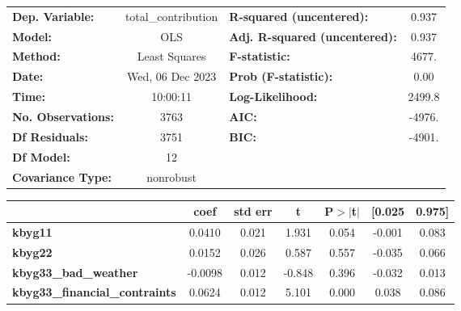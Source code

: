 \begin{center}
\begin{tabular}{lclc}
\toprule
\textbf{Dep. Variable:}                      & total\_contribution & \textbf{  R-squared (uncentered):}      &     0.937   \\
\textbf{Model:}                              &         OLS         & \textbf{  Adj. R-squared (uncentered):} &     0.937   \\
\textbf{Method:}                             &    Least Squares    & \textbf{  F-statistic:       }          &     4677.   \\
\textbf{Date:}                               &   Wed, 06 Dec 2023  & \textbf{  Prob (F-statistic):}          &     0.00    \\
\textbf{Time:}                               &       10:00:11      & \textbf{  Log-Likelihood:    }          &    2499.8   \\
\textbf{No. Observations:}                   &          3763       & \textbf{  AIC:               }          &    -4976.   \\
\textbf{Df Residuals:}                       &          3751       & \textbf{  BIC:               }          &    -4901.   \\
\textbf{Df Model:}                           &            12       & \textbf{                     }          &             \\
\textbf{Covariance Type:}                    &      nonrobust      & \textbf{                     }          &             \\
\bottomrule
\end{tabular}
\begin{tabular}{lcccccc}
                                             & \textbf{coef} & \textbf{std err} & \textbf{t} & \textbf{P$> |$t$|$} & \textbf{[0.025} & \textbf{0.975]}  \\
\midrule
\textbf{kbyg11}                              &       0.0410  &        0.021     &     1.931  &         0.054        &       -0.001    &        0.083     \\
\textbf{kbyg22}                              &       0.0152  &        0.026     &     0.587  &         0.557        &       -0.035    &        0.066     \\
\textbf{kbyg33\_bad\_weather}                &      -0.0098  &        0.012     &    -0.848  &         0.396        &       -0.032    &        0.013     \\
\textbf{kbyg33\_financial\_contraints}       &       0.0624  &        0.012     &     5.101  &         0.000        &        0.038    &        0.086     \\

\end{tabular}
\end{center}
